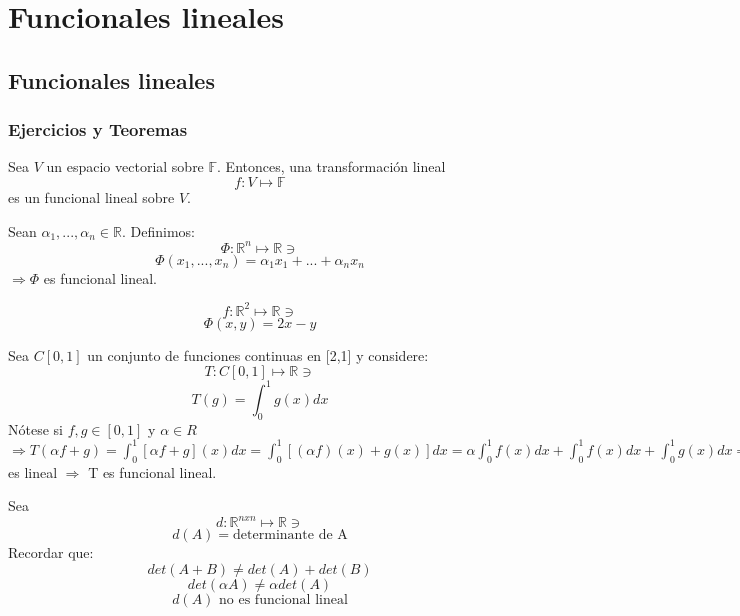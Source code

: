 
\part{Funcionales lineales}


\chapter{Funcionales lineales}

\section{Ejercicios y Teoremas}

\begin{definition}
Sea $V$ un espacio vectorial sobre $\mathbb{F}$. Entonces, una transformación lineal $$f:V\mapsto\mathbb{F}$$ es un funcional lineal sobre $V$. 
\end{definition}

\begin{exercise}
Sean $\alpha_1,...,\alpha_n \in\mathbb{R}$. Definimos:
$$\Phi:\mathbb{R}^n\mapsto\mathbb{R}\ni$$
$$\Phi(x_1,...,x_n)=\alpha_{1}x_{1}+...+\alpha_{n}x_{n}$$
$\Rightarrow\Phi$ es funcional lineal. 
\end{exercise}
\begin{notation}
$$f:\mathbb{R}^2\mapsto\mathbb{R}\ni$$
$$\Phi(x,y)=2x-y$$
\end{notation}

\begin{exercise}
Sea $C[0,1]$ un conjunto de funciones continuas en [2,1] y considere:
$$T:C[0,1]\mapsto\mathbb{R}\ni$$
$$T(g)=\int^1_0 g(x)dx$$
Nótese si $f,g\in[0,1]$ y $\alpha\in R$$\Rightarrow T(\alpha f+g)=\int^1_0[\alpha f+g](x)dx=\int^1_0[(\alpha f)(x)+g(x)]dx=\alpha\int^1_0f(x)dx+\int^1_0f(x)dx+\int^1_0 g(x)dx=\alpha T[f]+T[g]\Rightarrow$ es lineal $\Rightarrow$ T es funcional lineal. 
\end{exercise}

\begin{exercise}
Sea $$d:\mathbb{R}^{nxn}\mapsto\mathbb{R}\ni$$
$$d(A)=\text{determinante de A}$$
Recordar que: $$det(A+B)\neq det(A)+det(B)$$
$$det(\alpha A)\neq \alpha det(A)$$
$$d(A) \text{ no es funcional lineal}$$
\end{exercise}

